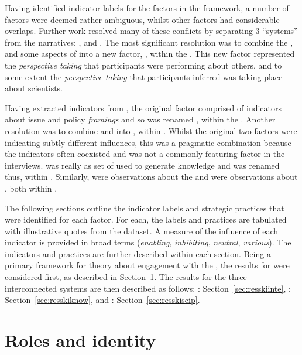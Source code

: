Having identified indicator labels for the factors in the \ISM{} framework, a number of factors were deemed rather ambiguous, whilst other factors had considerable overlaps. Further work resolved many of these conflicts by separating 3 ``systems'' from the narratives: \skiinte, \skiknow{} and \skiscip. The most significant resolution was to combine the \ISM{} \ismsn, \ismst{} and some aspects of \ismsm{} into a new factor, \skipers, within the \skiinte. This new factor represented the \emph{perspective taking} that participants were performing about others, and to some extent the \emph{perspective taking} that participants inferred was taking place about scientists. 

Having extracted \skipers{} indicators from \ismsm, the original \ISM{} factor comprised of indicators about issue and policy \emph{framings} and so was renamed \skifram, within the \skiknow. Another resolution was to combine \ISM{} \ismic{} and \ismia{} into \skiagen, within \skiinte. Whilst the original two factors were indicating subtly different influences, this was a pragmatic combination because the indicators often coexisted and \ismic{} was not a commonly featuring factor in the interviews. \ISM{} \ismmt{} was really as set of \skitech{} used to generate knowledge and was renamed thus, within \skiknow. Similarly, \ISM{} \ismmr{} were observations about the \skipoli{} and \ismmts{} were observations about \skieven{}, both within \skiscip.

The following sections outline the indicator labels and strategic practices that were identified for each factor. For each, the labels and practices are tabulated with illustrative quotes from the dataset. A measure of the influence of each indicator is provided in broad terms (\emph{enabling}, \emph{inhibiting}, \emph{neutral}, \emph{various}). The indicators and practices are further described within each section. Being a primary framework for theory about engagement with the \SPI, the results for \skirole{} were considered first, as described in Section~\ref{sec:resroles}. The results for the three interconnected systems are then described as follows: \skiinte: Section~\ref{sec:resskiinte}, \skiknow: Section~\ref{sec:resskiknow}, and \skiscip: Section~\ref{sec:resskiscip}. 

\section{Roles and identity}\label{sec:resroles}

